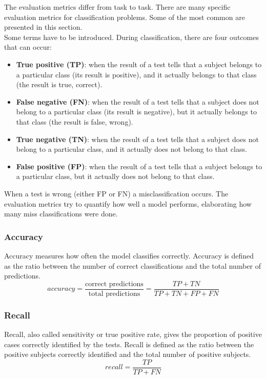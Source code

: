 The evaluation metrics differ from task to task. There are many specific evaluation metrics for classification problems. Some of the most common are presented in this section.\\

Some terms have to be introduced. During classification, there are four outcomes that can occur:
\begin{itemize}
    \item \textbf{True positive (\gls{TP})}: when the result of a test tells that a subject belongs to a particular class (its result is positive), and it actually belongs to that class (the result is true, correct).
    \item \textbf{False negative (\gls{FN})}: when the result of a test tells that a subject does not belong to a particular class (its result is negative), but it actually belongs to that class (the result is false, wrong).
    \item \textbf{True negative (\gls{TN})}: when the result of a test tells that a subject does not belong to a particular class, and it actually does not belong to that class.
    \item \textbf{False positive (\gls{FP})}: when the result of a test tells that a subject belongs to a particular class, but it actually does not belong to that class.
\end{itemize}


When a test is wrong (either \gls{FP} or \gls{FN}) a misclassification occurs. The evaluation metrics try to quantify how well a model performs, elaborating how many miss classifications were done.

\subsubsection{Accuracy}
Accuracy measures how often the model classifies correctly. Accuracy is defined as the ratio between the number of correct classifications and the total number of predictions.
\[
accuracy = \frac{\text{correct predictions}}{\text{total predictions}} = \frac{TP + TN}{TP + TN + FP + FN}
\]
\subsubsection{Recall}
Recall, also called sensitivity or true positive rate, gives the proportion of positive cases correctly identified by the tests. Recall is defined as the ratio between the positive subjects correctly identified and the total number of positive subjects.
\[
recall = \frac{TP}{TP + FN}
\]
